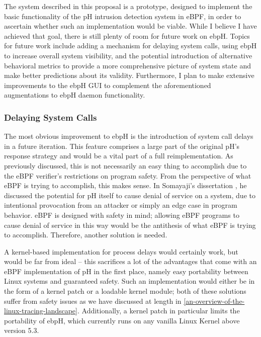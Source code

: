 \documentclass[
  12pt]{findlay}
\begin{document}
The system described in this proposal is a prototype, designed to
implement the basic functionality of the pH intrusion detection system
in eBPF, in order to ascertain whether such an implementation would be
viable. While I believe I have achieved that goal, there is still plenty
of room for future work on ebpH. Topics for future work include adding a
mechanism for delaying system calls, using ebpH to increase overall
system visibility, and the potential introduction of alternative
behavioral metrics to provide a more comprehensive picture of system
state and make better predictions about its validity. Furthermore, I
plan to make extensive improvements to the ebpH GUI to complement the
aforementioned augmentations to ebpH daemon functionality.

\hypertarget{delaying-system-calls}{%
\subsubsection{Delaying System Calls}\label{delaying-system-calls}}

The most obvious improvement to ebpH is the introduction of system call
delays in a future iteration. This feature comprises a large part of the
original pH's response strategy and would be a vital part of a full
reimplementation. As previously discussed, this is not necessarily an
easy thing to accomplish due to the eBPF verifier's restrictions on
program safety. From the perspective of what eBPF is trying to
accomplish, this makes sense. In Somayaji's dissertation
\autocite{soma02}, he discussed the potential for pH itself to cause
denial of service on a system, due to intentional provocation from an
attacker or simply an edge case in program behavior. eBPF is designed
with safety in mind; allowing eBPF programs to cause denial of service
in this way would be the antithesis of what eBPF is trying to
accomplish. Therefore, another solution is needed.

A kernel-based implementation for process delays would certainly work,
but would be far from ideal -- this sacrifices a lot of the advantages
that come with an eBPF implementation of pH in the first place, namely
easy portability between Linux systems and guaranteed safety. Such an
implementation would either be in the form of a kernel patch or a
loadable kernel module; both of these solutions suffer from safety
issues as we have discussed at length in
\autoref{an-overview-of-the-linux-tracing-landscape}. Additionally, a
kernel patch in particular limits the portability of ebpH, which
currently runs on any vanilla Linux Kernel above version 5.3.
\end{document}
